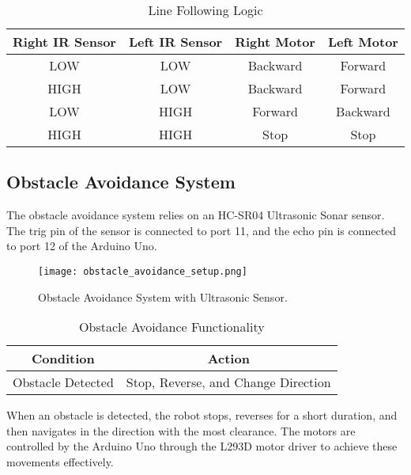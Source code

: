 \documentclass[conference]{IEEEtran}
\begin{document}
\begin{table}[H]
    \caption{Line Following Logic}
    \begin{center}
        \begin{tabular}{|c|c|c|c|}
            \hline
            \textbf{Right IR Sensor} & \textbf{Left IR Sensor} & \textbf{Right Motor} & \textbf{Left Motor} \\
            \hline
            LOW & LOW & Backward & Forward \\
            \hline
            HIGH & LOW & Backward & Forward \\
            \hline
            LOW & HIGH & Forward & Backward \\
            \hline
            HIGH & HIGH & Stop & Stop \\
            \hline
        \end{tabular}
        \label{tab:line_following_logic}
    \end{center}
\end{table}

\subsection{Obstacle Avoidance System}
The obstacle avoidance system relies on an HC-SR04 Ultrasonic Sonar sensor. The trig pin of the sensor is connected to port 11, and the echo pin is connected to port 12 of the Arduino Uno.

\begin{figure}[H]
    \centering
    \texttt{[image: obstacle\_avoidance\_setup.png]}
    \caption{Obstacle Avoidance System with Ultrasonic Sensor.}
    \label{fig:obstacle_avoidance}
\end{figure}

\begin{table}[H]
    \caption{Obstacle Avoidance Functionality}
    \begin{center}
        \begin{tabular}{|c|c|}
            \hline
            \textbf{Condition} & \textbf{Action} \\
            \hline
            Obstacle Detected & Stop, Reverse, and Change Direction \\
            \hline
        \end{tabular}
        \label{tab:obstacle_avoidance}
    \end{center}
\end{table}

When an obstacle is detected, the robot stops, reverses for a short duration, and then navigates in the direction with the most clearance. The motors are controlled by the Arduino Uno through the L293D motor driver to achieve these movements effectively.
\end{document}
